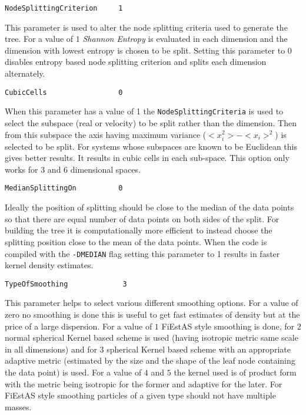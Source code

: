 \documentclass{article}
\begin{document}
\begin{verbatim}
NodeSplittingCriterion     1
\end{verbatim}
This parameter is used to alter the node splitting 
criteria used to generate the tree. 
For a value of $1$ \emph{Shannon Entropy} is evaluated
in each dimension and the dimension with lowest entropy 
is chosen to be split. Setting this parameter to $0$ 
disables entropy based node splitting criterion and 
splits each dimension alternately. 

\begin{verbatim}
CubicCells                 0
\end{verbatim}
When this parameter has a value
of 1 the \newline
\verb$NodeSplittingCriteria$ is used to 
select the subspace (real or velocity) to be split rather than the 
dimension.
Then from this subspace the axis having maximum  
variance ($<x_i^2>-<x_i>^2$) is selected to be split. 
For systems whose subspaces are known to be Euclidean this
gives better results. It results in cubic cells in 
each sub-space. This option only works for 3 and 6 dimensional spaces.


\begin{verbatim}
MedianSplittingOn          0
\end{verbatim}
Ideally the position of splitting should be close to
the median of the data points so that there are equal 
number of data points on both sides of the split.
For building the tree it is computationally  more efficient
to instead choose the splitting position close 
to the mean of the data points.
When the code is compiled with the \verb$-DMEDIAN$ flag 
setting this parameter to 1 results in faster kernel density estimates.

\begin{verbatim}
TypeOfSmoothing             3
\end{verbatim}
This parameter helps to select various different smoothing options.
For a value of zero no smoothing is done
this is useful to get fast estimates of 
density but at the price of a large dispersion.
For a value of $1$ FiEstAS style smoothing is done,
for $2$ normal spherical Kernel  based scheme is used (having 
isotropic metric same scale in all dimensions)  and
for $3$ spherical Kernel based scheme with an appropriate 
adaptive metric (estimated by the size and the shape of the 
leaf node containing the data point) is used.
For a value of $4$ and $5$ the kernel used is of product form with 
the metric being isotropic for the former and adaptive for the later. 
For  FiEstAS style smoothing particles of a given type should not 
have multiple masses. 
\end{document}
